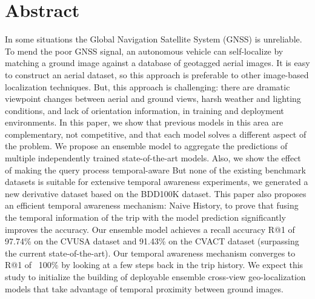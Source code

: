 \documentclass[10pt,letterpaper]{article}
\begin{document}
\section*{Abstract}
In some situations the Global Navigation Satellite System (GNSS) is unreliable. To mend the poor GNSS signal, an autonomous vehicle can self-localize by matching a ground image against a database of geotagged aerial images. It is easy to construct an aerial dataset, so this approach is preferable to other image-based localization techniques. But, this approach is challenging: there are dramatic viewpoint changes between aerial and ground views, harsh weather and lighting conditions, and lack of orientation information, in training and deployment environments. In this paper, we show that previous models in this area are complementary, not competitive, and that each model solves a different aspect of the problem. We propose an ensemble model to aggregate the predictions of multiple independently trained state-of-the-art models. Also, we show the effect of making the query process temporal-aware  But none of the existing benchmark datasets is suitable for extensive temporal awareness experiments, we generated a new derivative dataset based on the BDD100K dataset. This paper also proposes an efficient temporal awareness mechanism: Naive History, to prove that fusing the temporal information of the trip with the model prediction significantly improves the accuracy. Our ensemble model achieves a recall accuracy R@1 of 97.74\% on the CVUSA dataset and 91.43\% on the CVACT dataset (surpassing the current state-of-the-art). Our temporal awareness mechanism converges to R@1 of ~100\% by looking at a few steps back in the trip history. We expect this study to initialize the building of deployable ensemble cross-view geo-localization models that take advantage of temporal proximity between ground images.

\end{document}
